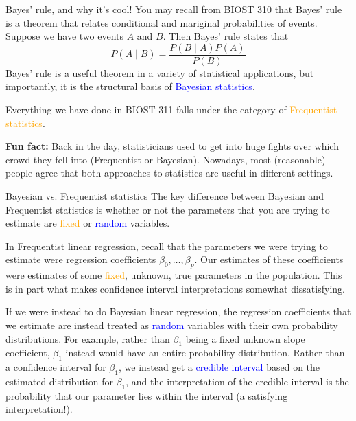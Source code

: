 \documentclass[10pt,t]{beamer}
\begin{document}
\begin{frame}{Bayes' rule, and why it's cool!}
You may recall from BIOST 310 that Bayes' rule is a theorem that relates conditional and mariginal probabilities of events. Suppose we have two events $A$ and $B$. Then Bayes' rule states that
$$
P(A \mid B)  = \frac{P(B \mid A) P(A)}{P(B)}
$$
Bayes' rule is a useful theorem in a variety of statistical applications, but importantly, it is the structural basis of \textcolor{blue}{Bayesian statistics}.

\vspace{0.3cm}

Everything we have done in BIOST 311 falls under the category of \textcolor{orange}{Frequentist statistics}.

\vspace{0.3cm}

\textbf{Fun fact:} Back in the day, statisticians used to get into huge fights over which crowd they fell into (Frequentist or Bayesian). Nowadays, most (reasonable) people agree that both approaches to statistics are useful in different settings.

\end{frame}

\begin{frame}{Bayesian vs. Frequentist statistics}
\small The key difference between Bayesian and Frequentist statistics is whether or not the parameters that you are trying to estimate are \textcolor{orange}{fixed} or \textcolor{blue}{random} variables.

\vspace{0.3cm}

In Frequentist linear regression, recall that the parameters we were trying to estimate were regression coefficients $\beta_0, \dots, \beta_p$. Our estimates of these coefficients were estimates of some \textcolor{orange}{fixed}, unknown, true parameters in the population. This is in part what makes confidence interval interpretations somewhat dissatisfying. 

\vspace{0.3cm}

If we were instead to do Bayesian linear regression, the regression coefficients that we estimate are instead treated as \textcolor{blue}{random} variables with their own probability distributions. For example, rather than $\beta_1$ being a fixed unknown slope coefficient, $\beta_1$ instead would have an entire probability distribution. Rather than a confidence interval for $\beta_1$, we instead get a \textcolor{blue}{credible interval} based on the estimated distribution for $\beta_1$, and the interpretation of the credible interval is the probability that our parameter lies within the interval (a satisfying interpretation!).

\end{frame}
\end{document}
